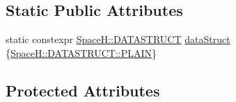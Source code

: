 \subsection*{Static Public Attributes}
\begin{DoxyCompactItemize}
\item 
static constexpr \mbox{\hyperlink{namespace_space_h_a4782f089179a3c269891f02482b072df}{Space\+H\+::\+D\+A\+T\+A\+S\+T\+R\+U\+CT}} \mbox{\hyperlink{class_space_h_1_1_vel_indep_particles_a066cbb08e0d444c27e2f71c30092e13f}{data\+Struct}} \{\mbox{\hyperlink{namespace_space_h_a4782f089179a3c269891f02482b072dfaf62eb0bf5e5c72e80983fbbac1cb70e5}{Space\+H\+::\+D\+A\+T\+A\+S\+T\+R\+U\+C\+T\+::\+P\+L\+A\+IN}}\}
\end{DoxyCompactItemize}
\subsection*{Protected Attributes}
